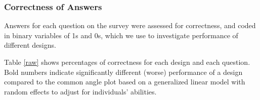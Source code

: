 \subsubsection*{Correctness of Answers}
Answers for each question on the survey were assessed for correctness, and coded in binary variables of 1s and 0s, which we use to investigate performance of different designs. 





Table \ref{raw} shows percentages of correctness for each design and each question. Bold numbers indicate significantly different (worse) performance of a design compared to the common angle plot based on a generalized linear model with random effects to adjust for individuals' abilities.


